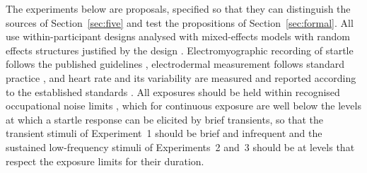 \documentclass[11pt]{article}
\theoremstyle{plain}
\theoremstyle{definition}
\begin{document}
The experiments below are proposals, specified so that they can distinguish the sources of Section~\ref{sec:five} and test the propositions of Section~\ref{sec:formal}. All use within-participant designs analysed with mixed-effects models with random effects structures justified by the design \citep{barr2013}. Electromyographic recording of startle follows the published guidelines \citep{blumenthal2005}, electrodermal measurement follows standard practice \citep{boucsein2012}, and heart rate and its variability are measured and reported according to the established standards \citep{taskforce1996}. All exposures should be held within recognised occupational noise limits \citep{niosh1998}, which for continuous exposure are well below the levels at which a startle response can be elicited by brief transients, so that the transient stimuli of Experiment~1 should be brief and infrequent and the sustained low-frequency stimuli of Experiments~2 and~3 should be at levels that respect the exposure limits for their duration.
\end{document}
